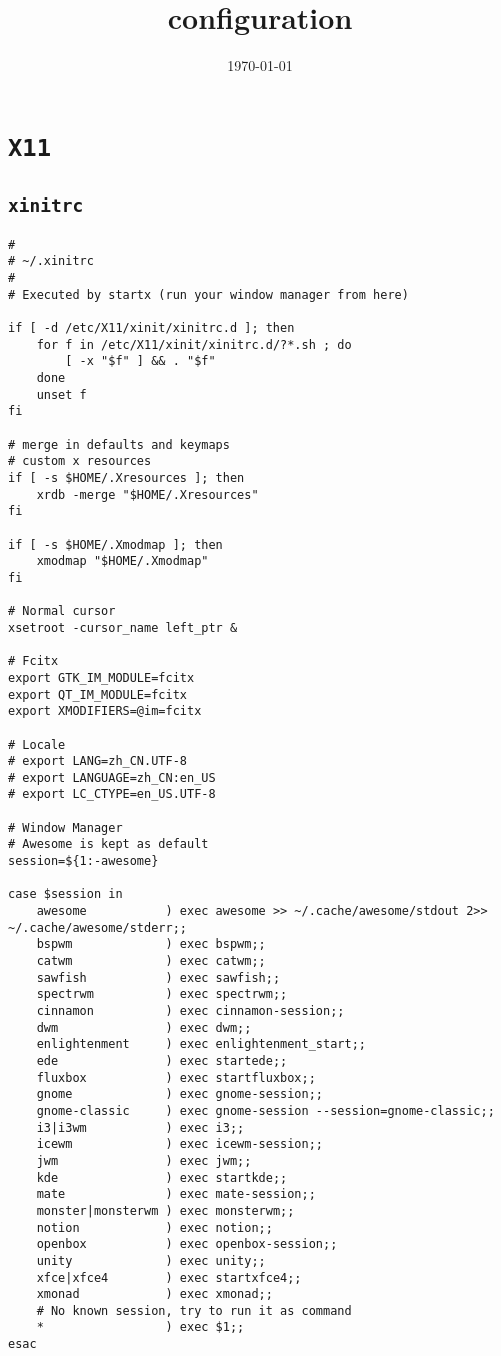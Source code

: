 \documentclass[11pt]{article}
\date{\today}
\title{configuration}
\begin{document}
\tableofcontents


\section{\texttt{X11}}
\label{sec:org537615a}

\subsection{\texttt{xinitrc}}
\label{sec:org7cc1509}

\lstset{language=bash,label= ,caption= ,captionpos=b,numbers=none}
\begin{lstlisting}
#
# ~/.xinitrc
#
# Executed by startx (run your window manager from here)

if [ -d /etc/X11/xinit/xinitrc.d ]; then
    for f in /etc/X11/xinit/xinitrc.d/?*.sh ; do
        [ -x "$f" ] && . "$f"
    done
    unset f
fi

# merge in defaults and keymaps
# custom x resources
if [ -s $HOME/.Xresources ]; then
    xrdb -merge "$HOME/.Xresources"
fi

if [ -s $HOME/.Xmodmap ]; then
    xmodmap "$HOME/.Xmodmap"
fi

# Normal cursor
xsetroot -cursor_name left_ptr &

# Fcitx
export GTK_IM_MODULE=fcitx
export QT_IM_MODULE=fcitx
export XMODIFIERS=@im=fcitx

# Locale
# export LANG=zh_CN.UTF-8
# export LANGUAGE=zh_CN:en_US
# export LC_CTYPE=en_US.UTF-8

# Window Manager
# Awesome is kept as default
session=${1:-awesome}

case $session in
    awesome           ) exec awesome >> ~/.cache/awesome/stdout 2>> ~/.cache/awesome/stderr;;
    bspwm             ) exec bspwm;;
    catwm             ) exec catwm;;
    sawfish           ) exec sawfish;;
    spectrwm          ) exec spectrwm;;
    cinnamon          ) exec cinnamon-session;;
    dwm               ) exec dwm;;
    enlightenment     ) exec enlightenment_start;;
    ede               ) exec startede;;
    fluxbox           ) exec startfluxbox;;
    gnome             ) exec gnome-session;;
    gnome-classic     ) exec gnome-session --session=gnome-classic;;
    i3|i3wm           ) exec i3;;
    icewm             ) exec icewm-session;;
    jwm               ) exec jwm;;
    kde               ) exec startkde;;
    mate              ) exec mate-session;;
    monster|monsterwm ) exec monsterwm;;
    notion            ) exec notion;;
    openbox           ) exec openbox-session;;
    unity             ) exec unity;;
    xfce|xfce4        ) exec startxfce4;;
    xmonad            ) exec xmonad;;
    # No known session, try to run it as command
    *                 ) exec $1;;
esac
\end{lstlisting}
\end{document}
